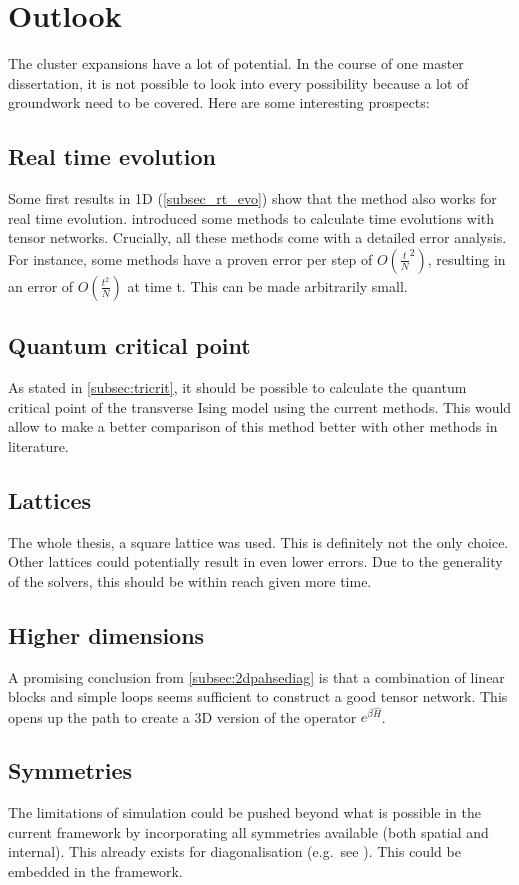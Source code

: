 \section{Outlook}

The cluster expansions have a lot of potential. In the course of one master dissertation, it is not possible to look into every possibility because a lot of groundwork need to be covered. Here are some interesting prospects:

\subsection*{Real time evolution}

Some first results in 1D (\cref{subsec_rt_evo}) show that the method also works for real time evolution.  introduced some methods to calculate time evolutions with tensor networks. Crucially, all these methods come with a detailed error analysis. For instance, some methods have a proven error per step of $O \left( \frac{t}{N}^2  \right)$, resulting in an error of $O \left( \frac{t^2}{N}  \right)$ at time t. This can be made arbitrarily small.

\subsection*{Quantum critical point}

As stated in \cref{subsec:tricrit}, it should be possible to calculate the quantum critical point of the transverse Ising model using the current methods. This would allow to make a better comparison of this method better with other methods in literature.

\subsection*{Lattices}

The whole thesis, a square lattice was used. This is definitely not the only choice. Other lattices could potentially result in even lower errors. Due to the generality of the solvers, this should be within reach given more time.

\subsection*{Higher dimensions}

A promising conclusion from \cref{subsec:2dpahsediag} is that a combination of linear blocks and simple loops seems sufficient to construct a good tensor network. This opens up the path to create a 3D version of the operator $e^{\beta \hat{H}}$.

\subsection*{Symmetries}

The limitations of simulation could be pushed beyond what is possible in the current framework by incorporating all symmetries available (both spatial and internal). This already exists for diagonalisation (e.g.\ see \cite{Wietek2018}). This could be embedded in the framework.
